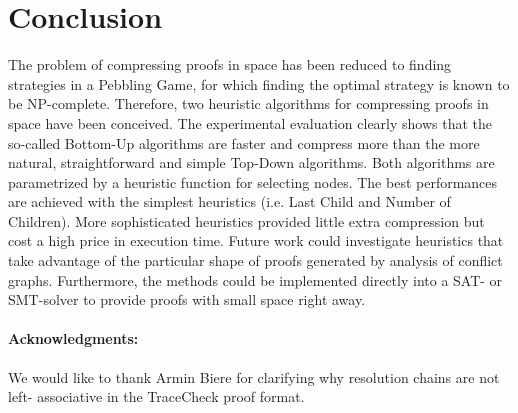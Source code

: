 \section{Conclusion}
\label{sec:conclusion}

The problem of compressing proofs in space has been reduced to finding strategies in a Pebbling Game, 
for which finding the optimal strategy is known to be NP-complete.
Therefore, two heuristic algorithms for compressing proofs in space have been conceived. 
The experimental evaluation clearly shows that the so-called Bottom-Up algorithms are faster and compress more than the more natural, 
straightforward and simple Top-Down algorithms. 
Both algorithms are parametrized by a heuristic function for selecting nodes. 
The best performances are achieved with the simplest heuristics (i.e. Last Child and Number of Children). 
More sophisticated heuristics provided little extra compression but cost a high price in execution time. 
Future work could investigate heuristics that take advantage of the particular shape of proofs generated by analysis of conflict graphs.
Furthermore, the methods could be implemented directly into a SAT- or SMT-solver to provide proofs with small space right away.

\vspace{-5pt}
\paragraph{Acknowledgments:} We would like to thank Armin Biere for clarifying why resolution chains are not left- associative in the TraceCheck proof format.

\vspace{-5pt}

